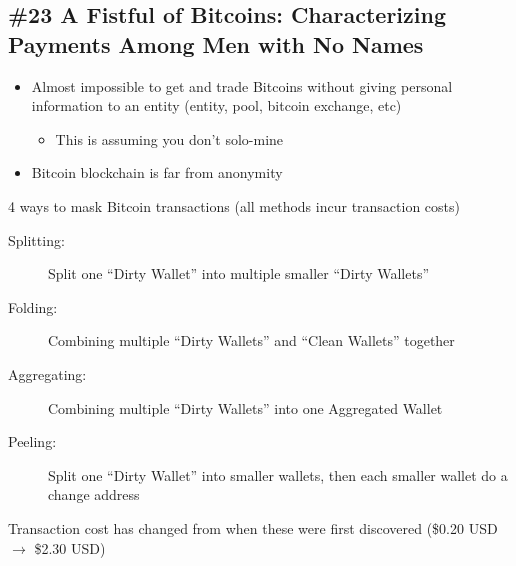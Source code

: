 \subsection*{\#23 A Fistful of Bitcoins: Characterizing Payments Among Men with No Names}
\begin{itemize}
	\item Almost impossible to get and trade Bitcoins without giving personal information to an entity (entity, pool, bitcoin exchange, etc)
	\begin{itemize}
		\item This is assuming you don't solo-mine
	\end{itemize}
	\item Bitcoin blockchain is far from anonymity
\end{itemize}
4 ways to mask Bitcoin transactions (all methods incur transaction costs)
\begin{description}
	\item[Splitting:] Split one ``Dirty Wallet'' into multiple smaller ``Dirty Wallets''
	\item[Folding:] Combining multiple ``Dirty Wallets'' and ``Clean Wallets'' together
	\item[Aggregating:] Combining multiple ``Dirty Wallets'' into one Aggregated Wallet
	\item[Peeling:] Split one ``Dirty Wallet'' into smaller wallets, then each smaller wallet do a change address
\end{description}
Transaction cost has changed from when these were first discovered (\$0.20 USD $\rightarrow$ \$2.30 USD)